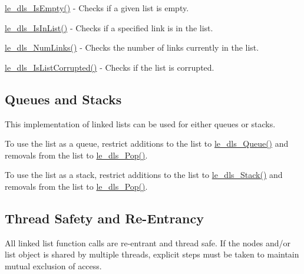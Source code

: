 \begin{DoxyItemize}
\item {\ttfamily \hyperlink{le__doubly_linked_list_8h_ab6068e41fca76311c0eeab36d9e23504}{le\+\_\+dls\+\_\+\+Is\+Empty()}} -\/ Checks if a given list is empty.
\item {\ttfamily \hyperlink{le__doubly_linked_list_8h_a13dd41bc5ca2c0b787bca4f57486f600}{le\+\_\+dls\+\_\+\+Is\+In\+List()}} -\/ Checks if a specified link is in the list.
\item {\ttfamily \hyperlink{le__doubly_linked_list_8h_a207e3dc720d0121f2e62eb639aea8d24}{le\+\_\+dls\+\_\+\+Num\+Links()}} -\/ Checks the number of links currently in the list.
\item {\ttfamily \hyperlink{le__doubly_linked_list_8h_a38538339f5eeb2f0c7205fc45a2a3f55}{le\+\_\+dls\+\_\+\+Is\+List\+Corrupted()}} -\/ Checks if the list is corrupted.
\end{DoxyItemize}\hypertarget{c_doubly_linked_list_dls_fifo}{}\subsection{Queues and Stacks}\label{c_doubly_linked_list_dls_fifo}
This implementation of linked lists can be used for either queues or stacks.

To use the list as a queue, restrict additions to the list to {\ttfamily \hyperlink{le__doubly_linked_list_8h_a264df63b847a9c485df0bf9050ac5deb}{le\+\_\+dls\+\_\+\+Queue()}} and removals from the list to {\ttfamily \hyperlink{le__doubly_linked_list_8h_a4bd942822ffc97004f46f9d062f62270}{le\+\_\+dls\+\_\+\+Pop()}}.

To use the list as a stack, restrict additions to the list to {\ttfamily \hyperlink{le__doubly_linked_list_8h_a90f9072a55ef0cb573bbdad91e34d368}{le\+\_\+dls\+\_\+\+Stack()}} and removals from the list to {\ttfamily \hyperlink{le__doubly_linked_list_8h_a4bd942822ffc97004f46f9d062f62270}{le\+\_\+dls\+\_\+\+Pop()}}.\hypertarget{c_doubly_linked_list_dls_synch}{}\subsection{Thread Safety and Re-\/\+Entrancy}\label{c_doubly_linked_list_dls_synch}
All linked list function calls are re-\/entrant and thread safe. If the nodes and/or list object is shared by multiple threads, explicit steps must be taken to maintain mutual exclusion of access.





